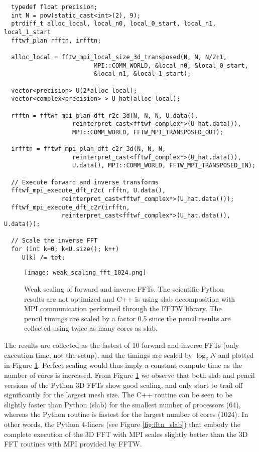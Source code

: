 \documentclass[final,3p,times,twocolumn]{elsarticle}
\begin{document}
\begin{figure*}[ht!]
\begin{lstlisting}
  typedef float precision;
  int N = pow(static_cast<int>(2), 9);
  ptrdiff_t alloc_local, local_n0, local_0_start, local_n1, local_1_start
  fftwf_plan rfftn, irfftn;

  alloc_local = fftw_mpi_local_size_3d_transposed(N, N, N/2+1,
                         MPI::COMM_WORLD, &local_n0, &local_0_start,
                         &local_n1, &local_1_start);

  vector<precision> U(2*alloc_local);
  vector<complex<precision> > U_hat(alloc_local);

  rfftn = fftwf_mpi_plan_dft_r2c_3d(N, N, N, U.data(),
                   reinterpret_cast<fftwf_complex*>(U_hat.data()),
                   MPI::COMM_WORLD, FFTW_MPI_TRANSPOSED_OUT);

  irfftn = fftwf_mpi_plan_dft_c2r_3d(N, N, N,
                   reinterpret_cast<fftwf_complex*>(U_hat.data()),
                   U.data(), MPI::COMM_WORLD, FFTW_MPI_TRANSPOSED_IN);

  // Execute forward and inverse transforms
  fftwf_mpi_execute_dft_r2c( rfftn, U.data(),
                reinterpret_cast<fftwf_complex*>(U_hat.data()));
  fftwf_mpi_execute_dft_c2r(irfftn,
                reinterpret_cast<fftwf_complex*>(U_hat.data()), U.data());

  // Scale the inverse FFT
  for (int k=0; k<U.size(); k++)
     U[k] /= tot;

\end{lstlisting}
\caption{C++ setup for the parallel FFT using FFTW.}
\label{fig:C++FFTW}
\end{figure*}




\begin{figure}[ht!]
\centering
\texttt{[image: weak\_scaling\_fft\_1024.png]}
\caption{Weak scaling of forward and inverse FFTs. The scientific Python 
results are not optimized and C++ is using slab 
decomposition with MPI communication performed through the FFTW library. The 
pencil timings are scaled by a factor 0.5 since the pencil results are 
collected using twice as many cores as slab.}
\label{fig:weak_FFT_scaling}
\end{figure}

The results are collected as the fastest of 10 forward and inverse FFTs (only 
execution time, not the setup), and the timings
are scaled by $\log_2N$ and plotted in Figure \ref{fig:weak_FFT_scaling}. 
Perfect scaling would thus imply a constant compute time as the number of cores 
is increased. From Figure \ref{fig:weak_FFT_scaling} we observe that both slab 
and pencil versions of the Python 3D FFTs show good scaling,
and only start to trail off significantly for the largest mesh size. The C++ 
routine can be seen to be slightly faster than Python (slab) for the 
smallest number of processors (64), whereas the Python routine is fastest for 
the largest number of cores (1024). In other words, the Python 4-liners (see 
Figure \ref{fig:fftn_slab}) that embody the complete execution of the 3D FFT 
with MPI scales slightly better than the 3D FFT routines with MPI provided by 
FFTW.  
\end{document}
